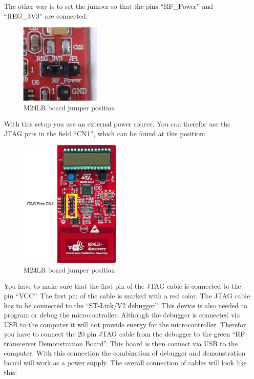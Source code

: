 \documentclass[11pt]{article}
\begin{document}
The other way is to set the jumper so that the pins "`RF\_Power"' and "`REG\_3V3"' are connected:

\begin{figure}[H]

 \centering
 \includegraphics [width=4cm]{jumper_active.jpg} 
 \caption{M24LR board jumper position}
\end{figure}

With this setup you use an external power source. You can therefor use the JTAG pins in the field "`CN1"', which can be found at this position:

\begin{figure}[H]

 \centering
 \includegraphics [width=5cm]{JTAG_CN1.jpg} 
 \caption{M24LR board jumper position}
\end{figure}

You have to make sure that the first pin of the JTAG cable is connected to the pin "`VCC"'. The first pin of the cable is marked with a red color. The JTAG cable has to be connected to the "`ST-Link/V2 debugger"'. This device is also needed to program or debug the microcontroller. Although the debugger is connected via USB to the computer it will not provide energy for the microcontroller. Therefor you have to connect the 20 pin JTAG cable from the debugger to the green "`RF transceiver Demonstration Board"'. This board is then connect via USB to the computer. With this connection the combination of debugger and demonstration board will work as a power supply. The overall connection of cables will look like this:
\end{document}
